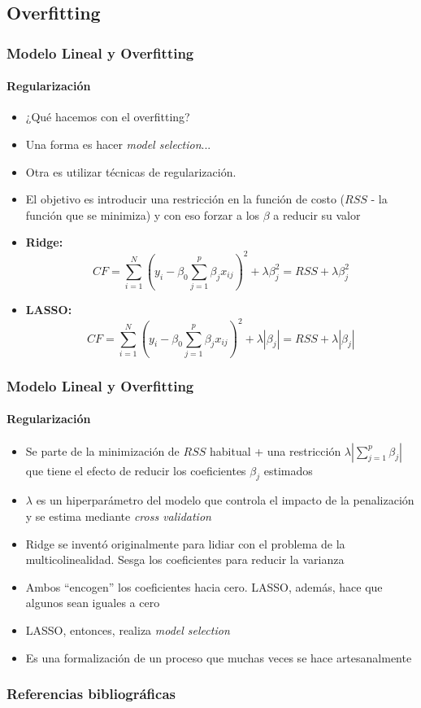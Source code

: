 \documentclass{beamer}
\begin{document}
\subsection{Overfitting}
\begin{frame}
	\frametitle{Modelo Lineal y Overfitting}
	\framesubtitle{Regularización}
	\begin{itemize}
		\item{¿Qué hacemos con el overfitting?}
		\item{Una forma es hacer \emph{model selection}...}
		\item{Otra es utilizar técnicas de regularización.}
		\item{El objetivo es introducir una restricción en la función de costo ($RSS$ - la función que se minimiza) y con eso forzar a los $\beta$} a reducir su valor \\
		\item{\textbf{Ridge:} 
			\begin{equation}
			CF = \sum_{i=1}^N(y_{i}-\beta_{0}\sum_{j=1}^p\beta_{j}x_{ij})^2 + \lambda\beta_{j}^2 = RSS + \lambda\beta_{j}^2
			\end{equation}}	
		\item{\textbf{LASSO:} 
			\begin{equation}
			CF = \sum_{i=1}^N(y_{i}-\beta_{0}\sum_{j=1}^p\beta_{j}x_{ij})^2 + \lambda|\beta_{j}| = RSS + \lambda|\beta_{j}|
			\end{equation}}	
	\end{itemize}
\end{frame}





\begin{frame}
	\frametitle{Modelo Lineal y Overfitting}
	\framesubtitle{Regularización}
	\begin{itemize}
		\item{Se parte de la minimización de $RSS$ habitual + una restricción $\lambda|\sum_{j=1}^p\beta_{j}|$ que tiene el efecto de reducir los coeficientes $\beta_{j}$ estimados}
		\item{$\lambda$ es un hiperparámetro del modelo que controla el impacto de la penalización y se estima mediante \emph{cross validation}}
		\item{Ridge se inventó originalmente para lidiar con el problema de la multicolinealidad. Sesga los coeficientes para reducir la varianza}
		\item{Ambos ``encogen'' los coeficientes hacia cero. LASSO, además, hace que algunos sean iguales a cero}
		\item{LASSO, entonces, realiza \emph{model selection}}
		\item{Es una formalización de un proceso que muchas veces se hace artesanalmente}
	\end{itemize}
\end{frame}


\begin{frame}[allowframebreaks] %

	\frametitle{Referencias bibliográficas}
		\scriptsize{}
\end{frame}
\end{document}
